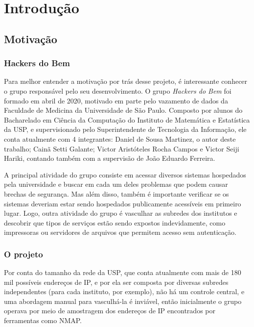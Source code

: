 
\chapter{Introdução}
\label{cap:introducao}

\section{Motivação}

\subsection{Hackers do Bem}
Para melhor entender a motivação por trás desse projeto, é interessante conhecer o grupo responsável pelo seu desenvolvimento. O grupo \textit{Hackers do Bem} foi formado em abril de 2020, motivado em parte pelo vazamento de dados da Faculdade de Medicina da Universidade de São Paulo. Composto por alunos do Bacharelado em Ciência da Computação do Instituto de Matemática e Estatística da USP, e supervisionado pelo Superintendente de Tecnologia da Informação, ele conta atualmente com 4 integrantes: Daniel de Sousa Martinez, o autor deste trabalho; Cainã Setti Galante; Victor Aristóteles Rocha Campos e Victor Seiji Hariki, contando também com a supervisão de João Eduardo Ferreira.

A principal atividade do grupo consiste em acessar diversos sistemas hospedados pela universidade e buscar em cada um deles problemas que podem causar brechas de segurança. Mas além disso, também é importante verificar se os sistemas deveriam estar sendo hospedados publicamente acessíveis em primeiro lugar. Logo, outra atividade do grupo é vasculhar as subredes
dos institutos e descobrir que tipos de serviços estão sendo expostos indevidamente, como impressoras ou servidores de arquivos que permitem acesso sem autenticação. 

\subsection{O projeto}

Por conta do tamanho da rede da USP, 
que conta atualmente com mais de 180 mil possíveis endereços de IP,  e por ela ser composta por diversas subredes independentes (para cada instituto, por exemplo), não há um controle central, e uma abordagem manual para vasculhá-la é inviável, então inicialmente o grupo operava por meio de amostragem dos endereços de IP encontrados por ferramentas como NMAP. 


